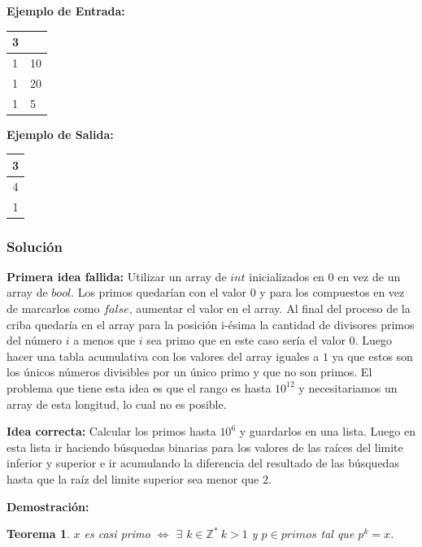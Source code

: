 \documentclass[12pt]{article}
\newcommand{\nl}{\vspace{0.3cm}}
\newtheorem{theorem}{Teorema}
\begin{document}
\nl

\textbf{Ejemplo de Entrada:}

\nl

\begin{tabular}{|l|l|}
	\hline 3 &  \\ 
	\hline 1 & 10 \\ 
	\hline 1 & 20 \\ 
	\hline 1 & 5 \\ 
	\hline 
\end{tabular} 

\nl

\textbf{Ejemplo de Salida:}

\nl

\begin{tabular}{|c|}
	\hline 3 \\ 
	\hline 4 \\ 
	\hline 1 \\ 
	\hline 
\end{tabular} 

\nl

\subsubsection{Solución}

\textbf{Primera idea fallida:} Utilizar un array de $int$ inicializados en $0$ en vez de un array de $bool$. Los primos quedarían con el valor $0$ y para los compuestos en vez de marcarlos como $false$, aumentar el valor en el array. Al final del proceso de la criba quedaría en el array para la posición i-ésima la cantidad de divisores primos del número $i$ a menos que $i$ sea primo que en este caso sería el valor $0$. Luego hacer una tabla acumulativa con los valores del array iguales a $1$ ya que estos son los únicos números divisibles por un único primo y que no son primos. El problema que tiene esta idea es que el rango es hasta $10^{12}$ y necesitariamos un array de esta longitud, lo cual no es posible.

\nl

\textbf{Idea correcta:} Calcular los primos hasta $10^6$ y guardarlos en una lista. Luego en esta lista ir haciendo búsquedas binarias para los valores de las raíces del limite inferior y superior e ir acumulando la diferencia del resultado de las búsquedas hasta que la raíz del limite superior sea menor que $2$.

\nl

\textbf{Demostración:}

\begin{theorem}
	$x$ es casi primo $\iff$ $\exists$ $k \in \mathbb{Z^*}\ k > 1$ y $p \in primos$ tal que $p^k = x$.
\end{theorem}
\end{document}
